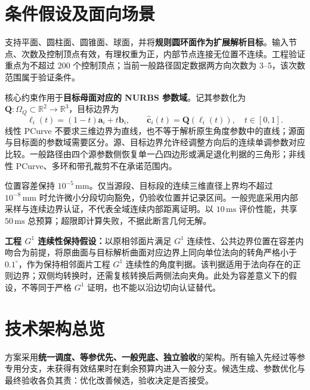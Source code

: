 \documentclass[UTF8,zihao=5,fontset=windows,a4paper]{ctexart}
\begin{document}
\section{条件假设及面向场景}
支持平面、圆柱面、圆锥面、球面，并将\textbf{规则圆环面作为扩展解析目标}。输入节点、次数及控制顶点有效，有理权重为正，内部节点连接无位置不连续。工程验证重点为不超过 200 个控制顶点；当前一般路径固定数据两方向次数为 3--5，该次数范围属于验证条件。

核心约束作用于\textbf{目标母面对应的 NURBS 参数域}。记其参数化为 $\mathbf Q:\Omega_Q\subset\mathbb R^2\to\mathbb R^3$，目标边界为
\[
\boldsymbol\ell_i(t)=(1-t)\mathbf a_i+t\mathbf b_i,\qquad
\widehat{\mathbf c}_i(t)=\mathbf Q(\boldsymbol\ell_i(t)),\quad t\in[0,1].
\]
线性 PCurve 不要求三维边界为直线，也不等于解析原生角度参数中的直线；源面与目标面的参数域需要区分。源、目标边界允许经调整方向后的连续单调参数对应比较。一般路径由四个源参数侧恢复单一凸四边形或满足退化判据的三角形；非线性 PCurve、多环和带孔裁剪不在承诺范围内。

位置容差保持 $10^{-5}\,\mathrm{mm}$。仅当源段、目标段的连续三维直径上界均不超过 $10^{-8}\,\mathrm{mm}$ 时允许微小分段切向豁免，仍验收位置并记录区间。一般兜底采用内部采样与连续边界认证，不代表全域连续内部距离证明。以 $10\,\mathrm{ms}$ 评价性能，共享 $50\,\mathrm{ms}$ 总预算；超限即计算失败，不据此断言几何无解。

\textbf{工程 $G^1$ 连续性保持假设：}以原相邻面片满足 $G^1$ 连续性、公共边界位置在容差内吻合为前提，将原曲面与目标解析曲面对应边界上同向单位法向的转角严格小于 $0.1^\circ$，作为保持相邻面片工程 $G^1$ 连续性的角度判据。该判据适用于法向存在的正则边界；双侧均转换时，还需复核转换后两侧法向夹角。此处为容差意义下的假设，不等同于严格 $G^1$ 证明，也不能以沿边切向认证替代。

\newpage
\section{技术架构总览}
方案采用\textbf{统一调度、等参优先、一般兜底、独立验收}的架构。所有输入先经过等参专用分支，未获得有效结果时在剩余预算内进入一般分支。候选生成、参数优化与最终验收各负其责：优化改善候选，验收决定是否接受。
\end{document}
